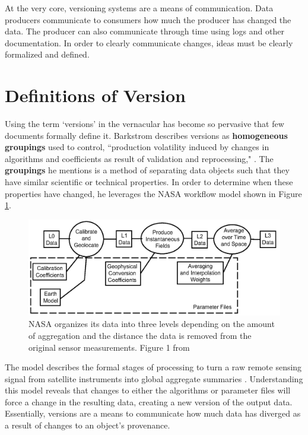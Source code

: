 At the very core, versioning systems are a means of communication.
Data producers communicate to consumers how much the producer has changed the data.
The producer can also communicate through time using logs and other documentation.
In order to clearly communicate changes, ideas must be clearly formalized and defined.

\section{Definitions of Version}

Using the term `versions' in the vernacular has become so pervasive that few documents formally define it.
Barkstrom describes versions as \textbf{homogeneous groupings} used to control, ``production volatility induced by changes in algorithms and coefficients as result of validation and reprocessing," \cite{Barkstrom2003}.
The \textbf{groupings} he mentions is a method of separating data objects such that they have similar scientific or technical properties.
In order to determine when these properties have changed, he leverages the NASA workflow model shown in Figure \ref{NASALevels}.
\begin{figure}
	\centering
	\includegraphics[scale=0.35]{figures/NASALevels.png}
	\caption[National Aeronautics and Space Administration organizes its data into three levels depending on the amount of aggregation and the distance the data is removed from the original sensor measurements.]{NASA organizes its data into three levels depending on the amount of aggregation and the distance the data is removed from the original sensor measurements. Figure 1 from \cite{Barkstrom2003}}
	\label{NASALevels}
\end{figure}
The model describes the formal stages of processing to turn a raw remote sensing signal from satellite instruments into global aggregate summaries \cite{Barkstrom2003}.
Understanding this model reveals that changes to either the algorithms or parameter files will force a change in the resulting data, creating a new version of the output data.
Essentially, versions are a means to communicate how much data has diverged as a result of changes to an object's provenance.

